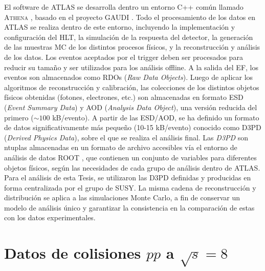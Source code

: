 El software de ATLAS se desarrolla dentro un entorno C++ común llamado
\textsc{Athena} \cite{CompuTDR,Lenzi:1214931,Calafiura:865624}, basado en el proyecto GAUDI \cite{Gaudi}. Todo el
procesamiento de los datos en ATLAS se realiza dentro de este entorno,
incluyendo la implementación y configuración del HLT, la simulación de la
respuesta del detector, la generación de las muestras MC de los distintos
procesos físicos, y la reconstrucción y análisis de los datos. Los eventos
aceptados por el trigger deben ser procesados para reducir su tamaño y ser
utilizados para los análisis offline. A la salida del EF, los eventos son
almacenados como RDOs (\emph{Raw Data Objects}). Luego de aplicar los algoritmos de
reconstrucción y calibración, las colecciones de los distintos objetos físicos
obtenidas (fotones, electrones, etc.) son almacenadas en formato ESD (\emph{Event
Summary Data}) y AOD (\emph{Analysis Data Object}), una versión reducida del primero
($\sim 100$ kB/evento). A partir de las ESD/AOD, se ha definido un formato de
datos significativamente más pequeño (10-15 kB/evento) conocido como D3PD
(\emph{Derived Physics Data}), sobre el que se realiza el análisis final. Las \emph{D3PD} son
ntuplas almacenadas en un formato de archivo accesibles vía el entorno de análisis de datos ROOT
\cite{Brun199781}, que contienen un conjunto de variables para diferentes objetos físicos,
según las necesidades de cada grupo de análisis dentro de ATLAS. Para el
análisis de esta Tesis, se utilizaron las D3PD definidas y producidas en forma
centralizada por el grupo de SUSY. La misma cadena de reconstrucción y
distribución se aplica a las simulaciones Monte Carlo, a fin de conservar un
modelo de análisis único y garantizar la consistencia en la comparación de estas
con los datos experimentales.


\section{Datos de colisiones $pp$ a $\sqrt{s} = 8$ \tev}

